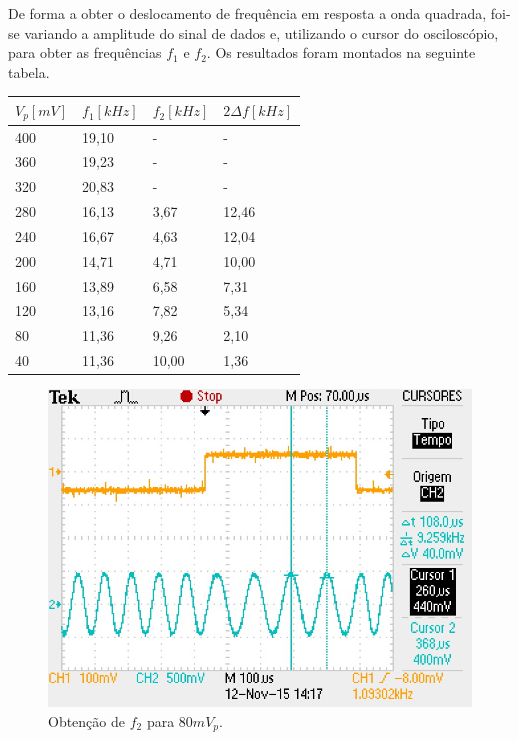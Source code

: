 \documentclass[12pt,a4paper]{article}%
\begin{document}
De forma a obter o deslocamento de frequência em resposta a onda quadrada, foi-se variando a amplitude do sinal de dados e, utilizando o cursor do osciloscópio, para obter as frequências $f_1$ e $f_2$. Os resultados foram montados na seguinte tabela.

 
\begin{table}[H]
\centering
\begin{tabular}{|l|l|l|l|}
\hline
$V_p [mV]$ & $f_1 [kHz]$  & $f_2 [kHz]$ & $2 \Delta{f} [kHz]$ \\ 
\hline
400 & 19,10 & - & - \\ 
\hline
360 & 19,23 & - & - \\ 
\hline
320 & 20,83 & - & - \\ 
\hline
280 & 16,13 & 3,67 & 12,46 \\ 
\hline
240 & 16,67 & 4,63 & 12,04 \\ 
\hline
200 & 14,71 & 4,71 & 10,00 \\ 
\hline
160 & 13,89 & 6,58 & 7,31 \\ 
\hline
120 & 13,16 & 7,82 & 5,34 \\ 
\hline
80 & 11,36 & 9,26 & 2,10 \\ 
\hline
40 & 11,36 & 10,00 & 1,36 \\ 
\hline
\end{tabular}
\end{table}

\begin{figure}[H]
\centering
\includegraphics[scale=0.5]{imagem/TEK0005}
\caption{Obtenção de $f_2$ para $80 mV_p$.}
\label{fig:05}
\end{figure}
\end{document}
